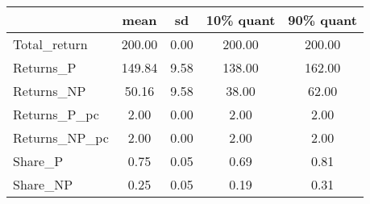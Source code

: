 \begin{tabular}{lcccc}
\toprule
{} &    mean &    sd &  10\% quant &  90\% quant \\
\midrule
Total\_return  &  200.00 &  0.00 &     200.00 &     200.00 \\
Returns\_P     &  149.84 &  9.58 &     138.00 &     162.00 \\
Returns\_NP    &   50.16 &  9.58 &      38.00 &      62.00 \\
Returns\_P\_pc  &    2.00 &  0.00 &       2.00 &       2.00 \\
Returns\_NP\_pc &    2.00 &  0.00 &       2.00 &       2.00 \\
Share\_P       &    0.75 &  0.05 &       0.69 &       0.81 \\
Share\_NP      &    0.25 &  0.05 &       0.19 &       0.31 \\
\bottomrule
\end{tabular}

